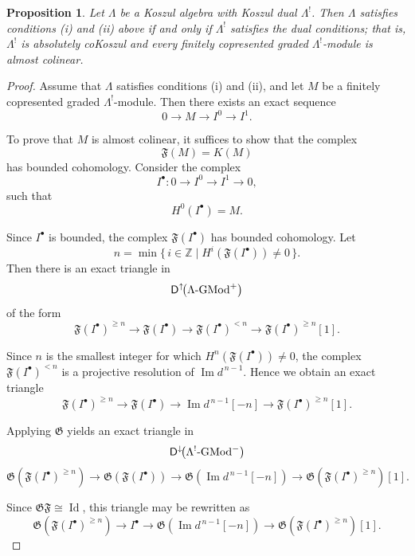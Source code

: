 \documentclass[11pt]{article}
\newtheorem{proposition}[theorem]{Proposition}
\theoremstyle{definition}
\theoremstyle{remark}
\begin{document}
\begin{proposition}
Let \(\Lambda\) be a Koszul algebra with Koszul dual \(\Lambda^{!}\). Then
\(\Lambda\) satisfies conditions \textup{(i)} and \textup{(ii)} above if and only if
\(\Lambda^{!}\) satisfies the dual conditions; that is, \(\Lambda^{!}\) is absolutely
coKoszul and every finitely copresented graded \(\Lambda^{!}\)-module is almost
colinear.
\end{proposition}
\begin{proof}
Assume that \(\Lambda\) satisfies conditions \textup{(i)} and \textup{(ii)}, and let \(M\) be a finitely copresented graded \(\Lambda^{!}\)-module. Then there exists an exact sequence
\[
0\longrightarrow M\longrightarrow I^0\longrightarrow I^1.
\]

To prove that \(M\) is almost colinear, it suffices to show that the complex
\[
\mathfrak{F}(M)=K(M)
\]
has bounded cohomology. Consider the complex
\[
I^{\bullet}\colon
0\longrightarrow I^0\longrightarrow I^1\longrightarrow 0,
\]
such that
\[
H^0(I^{\bullet})=M.
\]

Since \(I^{\bullet}\) is bounded, the complex \(\mathfrak{F}(I^{\bullet})\) has bounded cohomology. Let
\[
n=\min\{\,i\in\mathbb Z \mid H^{i}(\mathfrak{F}(I^{\bullet}))\neq 0\,\}.
\]
Then there is an exact triangle in
\[
\mathsf{D}^{\uparrow}\!\bigl(\Lambda\textup{-}\mathrm{GMod}^{+}\bigr)
\]
of the form
\[
\mathfrak{F}(I^{\bullet})^{\geq n}
\longrightarrow
\mathfrak{F}(I^{\bullet})
\longrightarrow
\mathfrak{F}(I^{\bullet})^{< n}
\longrightarrow
\mathfrak{F}(I^{\bullet})^{\geq n}[1].
\]

Since \(n\) is the smallest integer for which
\(H^{n}(\mathfrak{F}(I^{\bullet}))\neq 0\), the complex
\(\mathfrak{F}(I^{\bullet})^{< n}\) is a projective resolution of
\(\operatorname{Im} d^{\,n-1}\). Hence we obtain an exact triangle
\[
\mathfrak{F}(I^{\bullet})^{\geq n}
\longrightarrow
\mathfrak{F}(I^{\bullet})
\longrightarrow
\operatorname{Im} d^{\,n-1}[-n]
\longrightarrow
\mathfrak{F}(I^{\bullet})^{\geq n}[1].
\]

Applying \(\mathfrak{G}\) yields an exact triangle in
\[
\mathsf{D}^{\downarrow}\!\bigl(\Lambda^{!}\textup{-}\mathrm{GMod}^{-}\bigr)
\]
\[
\mathfrak{G}\!\left(\mathfrak{F}(I^{\bullet})^{\geq n}\right)
\longrightarrow
\mathfrak{G}\!\left(\mathfrak{F}(I^{\bullet})\right)
\longrightarrow
\mathfrak{G}\!\left(\operatorname{Im} d^{\,n-1}[-n]\right)
\longrightarrow
\mathfrak{G}\!\left(\mathfrak{F}(I^{\bullet})^{\geq n}\right)[1].
\]

Since \(\mathfrak{G}\mathfrak{F}\cong \operatorname{Id}\), this triangle may be rewritten as
\[
\mathfrak{G}\!\left(\mathfrak{F}(I^{\bullet})^{\geq n}\right)
\longrightarrow
I^{\bullet}
\longrightarrow
\mathfrak{G}\!\left(\operatorname{Im} d^{\,n-1}[-n]\right)
\longrightarrow
\mathfrak{G}\!\left(\mathfrak{F}(I^{\bullet})^{\geq n}\right)[1].
\]


\end{proof}
\end{document}
